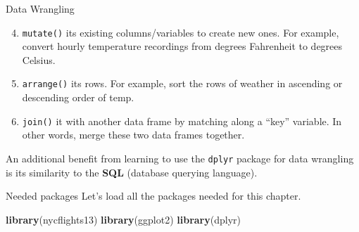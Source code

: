 \documentclass[
  ignorenonframetext,
]{beamer}
\newenvironment{Shaded}{\begin{snugshade}}{\end{snugshade}}
\newcommand{\FunctionTok}[1]{\textcolor[rgb]{0.13,0.29,0.53}{\textbf{#1}}}
\newcommand{\NormalTok}[1]{#1}
\begin{document}
\begin{frame}[fragile]{Data Wrangling}
\label{data-wrangling-2}
\begin{enumerate}
\setcounter{enumi}{3}
\item
  \texttt{mutate()} its existing columns/variables to create new ones.
  For example, convert hourly temperature recordings from degrees
  Fahrenheit to degrees Celsius.
\item
  \texttt{arrange()} its rows. For example, sort the rows of weather in
  ascending or descending order of temp.
\item
  \texttt{join()} it with another data frame by matching along a ``key''
  variable. In other words, merge these two data frames together.
\end{enumerate}

An additional benefit from learning to use the \texttt{dplyr} package
for data wrangling is its similarity to the \textbf{SQL} (database
querying language).
\end{frame}

\begin{frame}[fragile]{Needed packages}
\label{needed-packages}
Let's load all the packages needed for this chapter.

\normalsize

\begin{Shaded}
\begin{Highlighting}[]
\FunctionTok{library}\NormalTok{(nycflights13)}
\FunctionTok{library}\NormalTok{(ggplot2)}
\FunctionTok{library}\NormalTok{(dplyr)}
\end{Highlighting}
\end{Shaded}

\normalsize
\end{frame}
\end{document}
